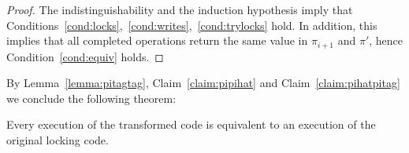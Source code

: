 \begin{proof}
The indistinguishability and the induction hypothesis imply that Conditions~\ref{cond:locks},~\ref{cond:writes},~\ref{cond:trylocks} hold.
In addition, this implies that all completed operations return the same value in $\pi_{i+1}$ and $\pi'$, hence Condition~\ref{cond:equiv} holds.

\end{proof}

By Lemma~\ref{lemma:pitagtag}, Claim~\ref{claim:pipihat} and Claim~\ref{claim:pihatpitag} we conclude the following
theorem:
\begin{theorem}
Every execution of the transformed code is equivalent to an
execution of the original locking code.
\end{theorem}
